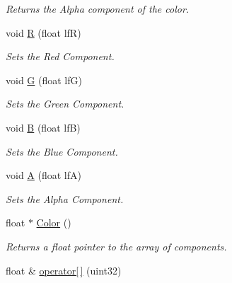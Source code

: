 \begin{DoxyCompactItemize}
\begin{DoxyCompactList}\small\item\em Returns the Alpha component of the color. \end{DoxyCompactList}\item 
\hypertarget{classc_r_g_b_a_a1fd2947185f01b4511e201ff532681df}{
void \hyperlink{classc_r_g_b_a_a1fd2947185f01b4511e201ff532681df}{R} (float lfR)}
\label{classc_r_g_b_a_a1fd2947185f01b4511e201ff532681df}

\begin{DoxyCompactList}\small\item\em Sets the Red Component. \end{DoxyCompactList}\item 
\hypertarget{classc_r_g_b_a_a9984d1f717f90c017a1ef4ad4f258fc4}{
void \hyperlink{classc_r_g_b_a_a9984d1f717f90c017a1ef4ad4f258fc4}{G} (float lfG)}
\label{classc_r_g_b_a_a9984d1f717f90c017a1ef4ad4f258fc4}

\begin{DoxyCompactList}\small\item\em Sets the Green Component. \end{DoxyCompactList}\item 
\hypertarget{classc_r_g_b_a_a147f72164155599d19dd7a265393c55f}{
void \hyperlink{classc_r_g_b_a_a147f72164155599d19dd7a265393c55f}{B} (float lfB)}
\label{classc_r_g_b_a_a147f72164155599d19dd7a265393c55f}

\begin{DoxyCompactList}\small\item\em Sets the Blue Component. \end{DoxyCompactList}\item 
\hypertarget{classc_r_g_b_a_ab1e15c350f6ea6e8a53780e847179cf4}{
void \hyperlink{classc_r_g_b_a_ab1e15c350f6ea6e8a53780e847179cf4}{A} (float lfA)}
\label{classc_r_g_b_a_ab1e15c350f6ea6e8a53780e847179cf4}

\begin{DoxyCompactList}\small\item\em Sets the Alpha Component. \end{DoxyCompactList}\item 
\hypertarget{classc_r_g_b_a_a2a3ea2dda2ee1081011795f650955370}{
float $\ast$ \hyperlink{classc_r_g_b_a_a2a3ea2dda2ee1081011795f650955370}{Color} ()}
\label{classc_r_g_b_a_a2a3ea2dda2ee1081011795f650955370}

\begin{DoxyCompactList}\small\item\em Returns a float pointer to the array of components. \end{DoxyCompactList}\item 
\hypertarget{classc_r_g_b_a_aa6b05808b1fa55cb21cbcb6fba301580}{
float \& \hyperlink{classc_r_g_b_a_aa6b05808b1fa55cb21cbcb6fba301580}{operator\mbox{[}$\,$\mbox{]}} (uint32)}
\label{classc_r_g_b_a_aa6b05808b1fa55cb21cbcb6fba301580}


\end{DoxyCompactItemize}
